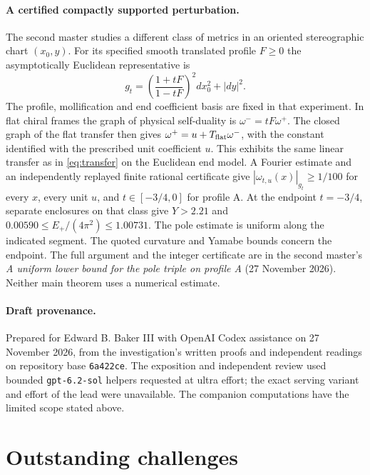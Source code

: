 \documentclass[11pt,letterpaper]{article}
\numberwithin{equation}{section}
\begin{document}
\paragraph{A certified compactly supported perturbation.}
The second master studies a different class of metrics in an oriented
stereographic chart \((x_0,y)\). For its specified smooth translated
profile \(F\ge0\) the asymptotically Euclidean representative is
\[
     g_t=\left(\frac{1+tF}{1-tF}\right)^2dx_0^2+|dy|^2 .
\]
The profile, mollification and end coefficient basis are fixed in that
experiment. In flat chiral frames the graph of physical self-duality is
\(\omega^-=tF\omega^+\). The closed graph of the flat transfer then gives
\(\omega^+=u+T_{\rm flat}\omega^-\), with the constant identified with
the prescribed unit coefficient \(u\). This exhibits the same linear
transfer as in \eqref{eq:transfer} on the Euclidean end model. A
Fourier estimate and an independently replayed finite rational
certificate give \(|\omega_{t,u}(x)|_{g_t}\ge1/100\) for every \(x\),
every unit \(u\), and \(t\in[-3/4,0]\) for profile A.
At the endpoint \(t=-3/4\), separate enclosures on that class give
\(Y>2.21\) and \(0.00590\le E_+/(4\pi^2)\le1.00731\).
The pole estimate is uniform along the indicated segment. The quoted
curvature and Yamabe bounds concern the endpoint. The full argument
and the integer certificate are in the second master's
\emph{A uniform lower bound for the pole triple on profile A}
(27 November 2026). Neither main theorem uses a numerical estimate.

\paragraph{Draft provenance.}
Prepared for Edward B. Baker III with OpenAI Codex assistance on
27 November 2026, from the investigation's written proofs and independent
readings on repository base \texttt{6a422ce}. The exposition and
independent review used bounded \texttt{gpt-6.2-sol} helpers requested
at ultra effort; the exact serving variant and effort of the lead were
unavailable. The companion computations have the limited scope stated
above.

\section{Outstanding challenges}
\label{sec:open}
\end{document}
